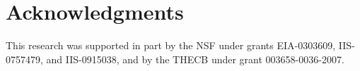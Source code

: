 \section{Acknowledgments}

This research was supported in part by the NSF under grants EIA-0303609,
IIS-0757479, and IIS-0915038, and by the THECB under grant 003658-0036-2007.

